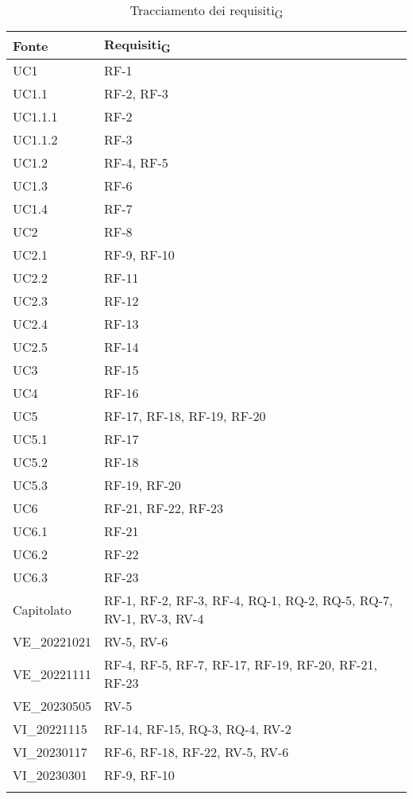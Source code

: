 \begin{center}
	\setlength\extrarowheight{5pt}
	\begin{xltabular}{\textwidth}{|X|X|}
	\hline
	\textbf{Fonte} & \textbf{Requisiti\textsubscript{G}} \\
	\hline
	UC1 & RF-1\\
	\hline
	UC1.1 & RF-2, RF-3\\
	\hline
	UC1.1.1 & RF-2\\
	\hline
	UC1.1.2 & RF-3\\
	\hline
	UC1.2 & RF-4, RF-5\\
	\hline
	UC1.3 & RF-6\\
	\hline
	UC1.4 & RF-7\\
	\hline
	UC2 & RF-8\\
	\hline
	UC2.1 & RF-9, RF-10\\
	\hline
	UC2.2 & RF-11\\
	\hline
	UC2.3 & RF-12\\
	\hline
	UC2.4 & RF-13\\
	\hline
	UC2.5 & RF-14\\
	\hline
	UC3 & RF-15\\ 
	\hline
	UC4 & RF-16\\
	\hline
	UC5 & RF-17, RF-18, RF-19, RF-20\\
	\hline
	UC5.1 & RF-17\\
	\hline
	UC5.2 & RF-18\\
	\hline
	UC5.3 & RF-19, RF-20\\
	\hline
	UC6 & RF-21, RF-22, RF-23\\
	\hline
	UC6.1 & RF-21\\
	\hline
	UC6.2 & RF-22\\
	\hline
	UC6.3 & RF-23\\
	\hline
	Capitolato & RF-1, RF-2, RF-3, RF-4, RQ-1, RQ-2, RQ-5, RQ-7, RV-1, RV-3, RV-4\\
	\hline
	VE\_20221021 & RV-5, RV-6\\
	\hline
	VE\_20221111 & RF-4, RF-5, RF-7, RF-17, RF-19, RF-20, RF-21, RF-23\\
 \hline
 VE\_20230505 & RV-5\\
	\hline
	VI\_20221115 & RF-14, RF-15, RQ-3, RQ-4, RV-2\\
	\hline
	VI\_20230117 & RF-6, RF-18, RF-22, RV-5, RV-6\\
	\hline
	VI\_20230301 & RF-9, RF-10\\
	\hline
	\caption{Tracciamento dei requisiti\textsubscript{G}}
	\end{xltabular}
\end{center}

